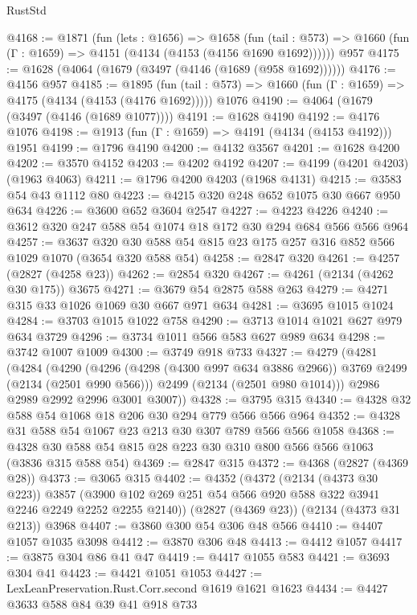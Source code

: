 \begin{lexlean}{RustStd}
\begin{coremodule}
@4168 := @1871
    (fun (lets : @1656) =>
    @1658
      (fun (tail : @573) => @1660 (fun (Γ : @1659) => @4151 (@4134 (@4153 (@4156 @1690 @1692))))))
    @957
@4175 := @1628 (@4064 (@1679 (@3497 (@4146 (@1689 (@958 @1692))))))
@4176 := @4156 @957
@4185 := @1895
    (fun (tail : @573) => @1660 (fun (Γ : @1659) => @4175 (@4134 (@4153 (@4176 @1692)))))
    @1076
@4190 := @4064 (@1679 (@3497 (@4146 (@1689 @1077))))
@4191 := @1628 @4190
@4192 := @4176 @1076
@4198 := @1913 (fun (Γ : @1659) => @4191 (@4134 (@4153 @4192))) @1951
@4199 := @1796 @4190
@4200 := @4132 @3567
@4201 := @1628 @4200
@4202 := @3570 @4152
@4203 := @4202 @4192
@4207 := @4199 (@4201 @4203) (@1963 @4063)
@4211 := @1796 @4200 @4203 (@1968 @4131)
@4215 := @3583 @54 @43 @1112 @80
@4223 := @4215 @320 @248 @652 @1075 @30 @667 @950 @634
@4226 := @3600 @652 @3604 @2547
@4227 := @4223 @4226
@4240 := @3612 @320 @247 @588 @54 @1074 @18 @172 @30 @294 @684 @566 @566 @964
@4257 := @3637 @320 @30 @588 @54 @815 @23 @175 @257 @316 @852 @566 @1029 @1070 (@3654 @320 @588 @54)
@4258 := @2847 @320
@4261 := @4257 (@2827 (@4258 @23))
@4262 := @2854 @320
@4267 := @4261 (@2134 (@4262 @30 @175)) @3675
@4271 := @3679 @54 @2875 @588 @263
@4279 := @4271 @315 @33 @1026 @1069 @30 @667 @971 @634
@4281 := @3695 @1015 @1024
@4284 := @3703 @1015 @1022 @758
@4290 := @3713 @1014 @1021 @627 @979 @634 @3729
@4296 := @3734 @1011 @566 @583 @627 @989 @634
@4298 := @3742 @1007 @1009
@4300 := @3749 @918 @733
@4327 := @4279
    (@4281
      (@4284
        (@4290
          (@4296 (@4298 (@4300 @997 @634 @3886 @2966)) @3769 @2499 (@2134 (@2501 @990 @566)))
          @2499
          (@2134 (@2501 @980 @1014)))
        @2986
        @2989
        @2992
        @2996
        @3001
        @3007))
@4328 := @3795 @315
@4340 := @4328 @32 @588 @54 @1068 @18 @206 @30 @294 @779 @566 @566 @964
@4352 := @4328 @31 @588 @54 @1067 @23 @213 @30 @307 @789 @566 @566 @1058
@4368 := @4328 @30 @588 @54 @815 @28 @223 @30 @310 @800 @566 @566 @1063 (@3836 @315 @588 @54)
@4369 := @2847 @315
@4372 := @4368 (@2827 (@4369 @28))
@4373 := @3065 @315
@4402 := @4352
    (@4372
      (@2134 (@4373 @30 @223))
      @3857
      (@3900 @102 @269 @251 @54 @566 @920 @588 @322 @3941 @2246 @2249 @2252 @2255 @2140))
    (@2827 (@4369 @23))
    (@2134 (@4373 @31 @213))
    @3968
@4407 := @3860 @300 @54 @306 @48 @566
@4410 := @4407 @1057 @1035 @3098
@4412 := @3870 @306 @48
@4413 := @4412 @1057
@4417 := @3875 @304 @86 @41 @47
@4419 := @4417 @1055 @583
@4421 := @3693 @304 @41
@4423 := @4421 @1051 @1053
@4427 := LexLeanPreservation.Rust.Corr.second @1619 @1621 @1623
@4434 := @4427 @3633 @588 @84 @39 @41 @918 @733

\end{coremodule}
\end{lexlean}
